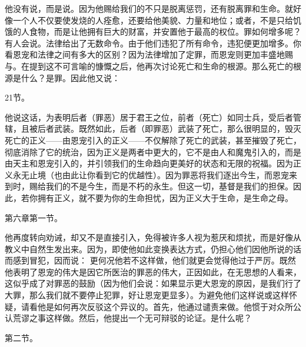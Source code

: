 \par

他没有说，而是说。因为他赐给我们的不只是脱离惩罚，还有脱离罪和生命。就好像一个人不仅要使发烧的人痊愈，还要给他美貌、力量和地位；或者，不是只给饥饿的人食物，而是让他拥有巨大的财富，并安置他于最高的权位。罪如何增多呢？有人会说。法律给出了无数命令。由于他们违犯了所有命令，违犯便更加增多。你看恩宠和法律之间有多大的区别？因为法律增加了定罪，而恩宠则更加丰盛地赐与。在提到这不可言喻的慷慨之后，他再次讨论死亡和生命的根源。那么死亡的根源是什么？是罪。因此他又说：\par

21节。\par

他说这话，为表明后者（罪恶）居于君王之位，前者（死亡）如同士兵，受后者管辖，且被后者武装。既然如此，后者（即罪恶）武装了死亡，那么很明显的，毁灭死亡的正义——由恩宠引入的正义——不仅解除了死亡的武装，甚至摧毁了死亡，彻底消除了它的统治，因为正义是两者中更大的，它不是由人和魔鬼引入的，而是由天主和恩宠引入的，并引领我们的生命趋向更美好的状态和无限的祝福。因为正义永无止境（也由此让你看到它的优越性）。因为罪恶将我们逐出今生，而恩宠来到时，赐给我们的不是今生，而是不朽的永生。但这一切，基督是我们的担保。因此，若你拥有正义，就不要为你的生命担忧，因为正义大于生命，是生命之母。\par

第六章第一节。\par

他再度转向劝诫，却又不是直接引入，免得被许多人视为惹厌和烦扰，而是好像从教义中自然生发出来。因为，即使他如此变换表达方式，仍担心他们因他所说的话而感到冒犯，因而说： 更何况他若不这样做，他们就更会觉得他过于严厉。既然他表明了恩宠的伟大是因它所医治的罪恶的伟大，正因如此，在无思想的人看来，这似乎成了对罪恶的鼓励（因为他们会说：如果显示更大恩宠的原因，是我们行了大罪，那么我们就不要停止犯罪，好让恩宠更显多）。为避免他们这样说或这样怀疑，请看他是如何再次反驳这个异议的。首先，他通过谴责来做。他惯于对众所公认荒谬之事这样做。然后，他提出一个无可辩驳的论证。是什么呢？\par

第二节。\par

